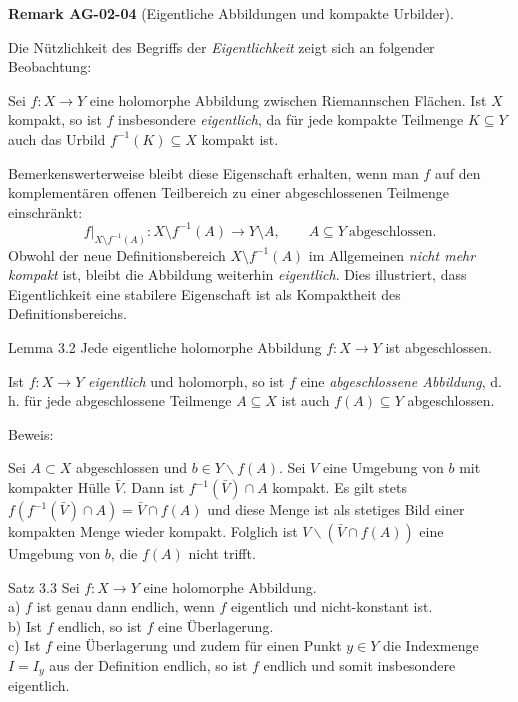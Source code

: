 \documentclass[10pt, letterpaper]{article}
\newcommand{\CustomHeading}[3]{%
  \par\medskip\noindent%
  \textbf{#1 #2} \textnormal{(#3)}.\enskip%
}
\newenvironment{REM}[2]{\begin{unitbox}\CustomHeading{Remark}{#1}{#2}}{\end{unitbox}}
\begin{document}
\begin{REM}{AG-02-04}{Eigentliche Abbildungen und kompakte Urbilder}
Die Nützlichkeit des Begriffs der \emph{Eigentlichkeit} zeigt sich an folgender Beobachtung:

Sei \(f:X\to Y\) eine holomorphe Abbildung zwischen Riemannschen Flächen.  
Ist \(X\) kompakt, so ist \(f\) insbesondere \emph{eigentlich}, da für jede kompakte Teilmenge \(K\subseteq Y\) auch das Urbild \(f^{-1}(K)\subseteq X\) kompakt ist.

Bemerkenswerterweise bleibt diese Eigenschaft erhalten, wenn man \(f\) auf den komplementären offenen Teilbereich zu einer abgeschlossenen Teilmenge einschränkt:
\[
f|_{X\setminus f^{-1}(A)}: X\setminus f^{-1}(A)\longrightarrow Y\setminus A,
\qquad A\subseteq Y\ \text{abgeschlossen.}
\]
Obwohl der neue Definitionsbereich \(X\setminus f^{-1}(A)\) im Allgemeinen \emph{nicht mehr kompakt} ist,
bleibt die Abbildung weiterhin \emph{eigentlich}.
Dies illustriert, dass Eigentlichkeit eine stabilere Eigenschaft ist als Kompaktheit des Definitionsbereichs.
\end{REM}

Lemma 3.2 Jede eigentliche holomorphe Abbildung $f: X \rightarrow Y$ ist abgeschlossen.


Ist \(f:X\to Y\) \emph{eigentlich} und holomorph, so ist \(f\) eine
\emph{abgeschlossene Abbildung}, d.\,h.
für jede abgeschlossene Teilmenge \(A\subseteq X\) ist auch \(f(A)\subseteq Y\) abgeschlossen.


Beweis: 

Sei $A \subset X$ abgeschlossen und $b \in Y \backslash f(A)$. Sei $V$ eine Umgebung von $b$ mit kompakter Hülle $\bar{V}$. Dann ist $f^{-1}(\bar{V}) \cap A$ kompakt. Es gilt stets $f\left(f^{-1}(\bar{V}) \cap A\right)=\bar{V} \cap f(A)$ und diese Menge ist als stetiges Bild einer kompakten Menge wieder kompakt. Folglich ist $V \backslash(\bar{V} \cap f(A))$ eine Umgebung von $b$, die $f(A)$ nicht trifft.

Satz 3.3 Sei $f: X \rightarrow Y$ eine holomorphe Abbildung.\\
a) $f$ ist genau dann endlich, wenn $f$ eigentlich und nicht-konstant ist.\\
b) Ist $f$ endlich, so ist $f$ eine Überlagerung.\\
c) Ist $f$ eine Überlagerung und zudem für einen Punkt $y \in Y$ die Indexmenge $I=I_{y}$ aus der Definition endlich, so ist $f$ endlich und somit insbesondere eigentlich.
\end{document}
